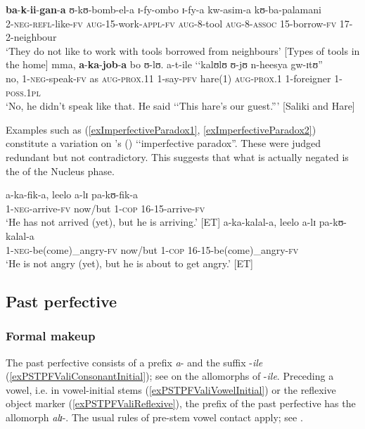 \begin{exe}
\ex \label{NegPrsPfv1}\gll \textbf{ba}-\textbf{k}-\textbf{ii}-\textbf{gan}-\textbf{a} ʊ-kʊ-bomb-el-a ɪ-fy-ombo ɪ-fy-a kw-asim-a kʊ-ba-palamani\\
2-\textsc{neg}-\textsc{refl}-like-\textsc{fv} \textsc{aug}-15-work-\textsc{appl}-\textsc{fv} \textsc{aug}-8-tool \textsc{aug}-8-\textsc{assoc} 15-borrow-\textsc{fv} 17-2-neighbour\\
\glt \lq They do not like to work with tools borrowed from neighbours' [Types of tools in the home] %
\ex  \label{NegPrsPfv2}\gll mma, \textbf{a}-\textbf{ka}-\textbf{job}-\textbf{a} bo ʊ-lʊ. a-t-ile \textup{\lq\lq}kalʊlʊ ʊ-jʊ n-heesya gw-ɪtʊ\textup{''}\\
no, 1-\textsc{neg}-speak-\textsc{fv} as \textsc{aug}-\textsc{prox.11} 1-say-\textsc{pfv} \phantom{\lq\lq}hare(1) \textsc{aug}-\textsc{prox.1} 1-foreigner 1-\textsc{poss.1pl}\\
\glt \lq No, he didn't speak like that. He said \lq\lq This hare's our guest.''' [Saliki and Hare]
\end{exe}
Examples such as (\ref{exImperfectiveParadox1}, \ref{exImperfectiveParadox2}) constitute a variation on \citeauthor{DowtyD1979}'s (\citeyear{DowtyD1979}) \lq\lq imperfective paradox''. These were judged redundant but not contradictory. This suggests that what is actually negated is the  of the Nucleus phase.

\begin{exe}
\ex \label{exImperfectiveParadox1} \gll a-ka-fik-a, leelo a-lɪ pa-kʊ-fik-a\\
1-\textsc{neg}-arrive-\textsc{fv} now/but 1-\textsc{cop} 16-15-arrive-\textsc{fv}\\
\glt \lq He has not arrived (yet), but he is arriving.' [ET]
\ex \label{exImperfectiveParadox2} \gll a-ka-kalal-a, leelo a-lɪ pa-kʊ-kalal-a\\
1-\textsc{neg}-be(come)\_angry-\textsc{fv} now/but 1-\textsc{cop} 16-15-be(come)\_angry-\textsc{fv}\\
\glt \lq He is not angry (yet), but he is about to get angry.' [ET]
\end{exe}
\subsection{Past perfective}\label{PastPerfective}
\subsubsection{Formal makeup}
The past perfective consists of a prefix \textit{a}- and the suffix -\textit{ile} (\ref{exPSTPFValiConsonantInitial}); see  on the allomorphs of -\textit{ile}. Preceding a vowel, i.e. in vowel-initial stems (\ref{exPSTPFValiVowelInitial}) or the reflexive object marker (\ref{exPSTPFValiReflexive}), the prefix of the past perfective has the allomorph \textit{alɪ}-. The usual rules of pre-stem vowel contact apply; see .

